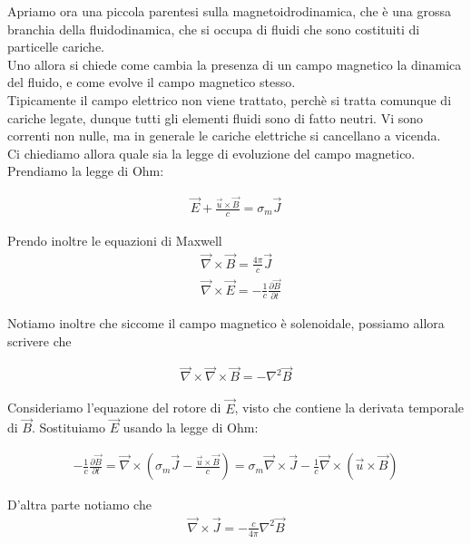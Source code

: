 \documentclass{report}
\begin{document}
Apriamo ora una piccola parentesi sulla magnetoidrodinamica, che è una grossa branchia della fluidodinamica, che si occupa di fluidi che sono costituiti di particelle cariche.\\
Uno allora si chiede come cambia la presenza di un campo magnetico la dinamica del fluido, e come evolve il campo magnetico stesso. \\

Tipicamente il campo elettrico non viene trattato, perchè si tratta comunque di cariche legate, dunque tutti gli elementi fluidi sono di fatto neutri. Vi sono correnti non nulle, ma in generale le cariche elettriche si cancellano a vicenda. \\

Ci chiediamo allora quale sia la legge di evoluzione del campo magnetico. Prendiamo la legge di Ohm: 

\begin{align}
    \vec{E} + \frac{\vec{u}\times \vec{B}}{c} = \sigma_m \vec{J}
\end{align}

Prendo inoltre le equazioni di Maxwell 
\begin{align}
    & \vec{\nabla}\times \vec{B} = \frac{4\pi}{c}\vec{J} \\
    & \vec{\nabla}\times \vec{E} = -\frac{1}{c}\frac{\partial \vec{B}}{\partial t}
\end{align}


Notiamo inoltre che siccome il campo magnetico è solenoidale, possiamo allora scrivere che 

\begin{align}
    \vec{\nabla}\times \vec{\nabla}\times \vec{B} = -\nabla^2\vec{B}
\end{align}

Consideriamo l'equazione del rotore di \(\vec{E}\), visto che contiene la derivata temporale di \(\vec{B}\). Sostituiamo \(\vec{E}\) usando la legge di Ohm: 

\begin{align}
    -\frac{1}{c}\frac{\partial \vec{B}}{\partial t} = \vec{\nabla}\times \left(\sigma_m\vec{J}  - \frac{\vec{u}\times \vec{B}}{c}\right) = \sigma_m \vec{\nabla}\times \vec{J} - \frac{1}{c}\vec{\nabla}\times (\vec{u}\times \vec{B})
\end{align}

D'altra parte notiamo che 
\begin{align}
    \vec{\nabla}\times \vec{J} = -\frac{c}{4\pi}\nabla^2\vec{B}
\end{align}
\end{document}
